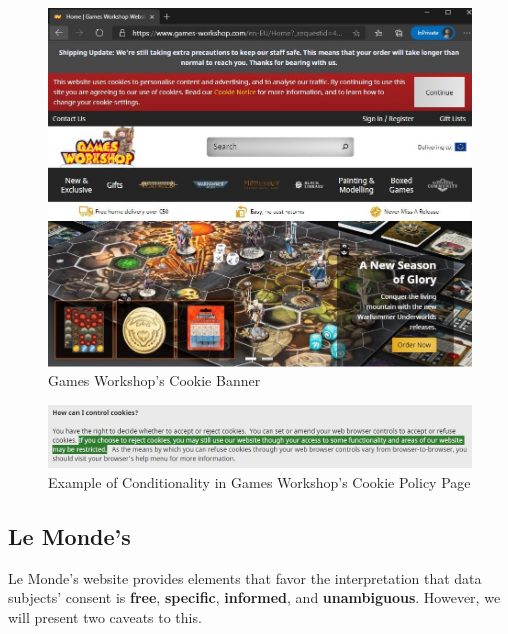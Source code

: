 \documentclass[twocolumn, letterpaper]{scrartcl}
\begin{document}
 		\begin{figure}
    		\includegraphics[width=0.95\linewidth]{gw_website.JPG}
     		\caption{Games Workshop's Cookie Banner \label{fig:a}}
     	\end{figure}
    
        \begin{figure}[tbp]	
            \includegraphics[width=0.95\linewidth]{conditionality.JPG}
            \caption{Example of Conditionality in Games Workshop's Cookie Policy Page \label{fig:b}}
        \end{figure}
        
	\subsection*{Le Monde's}

    	Le Monde's website provides elements that favor the interpretation that data subjects' consent is \textbf{free}, \textbf{specific}, \textbf{informed}, and \textbf{unambiguous}. However, we will present two caveats to this. 
        
\end{document}

